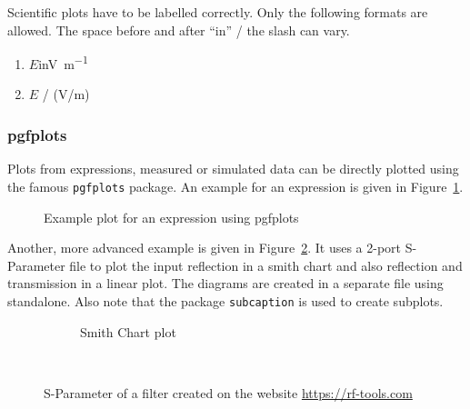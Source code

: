 		Scientific plots have to be labelled correctly. Only the following formats are allowed. The space before and after \enquote{in} / the slash can vary.
		
		\begin{enumerate}
			\item $E${\qquad}in{\qquad}\si{\volt\per\meter}
			\item $E$ / (\si{\volt}/\si{\meter})
		\end{enumerate}
	
		\subsubsection{pgfplots}
		
		Plots from expressions, measured or simulated data can be directly plotted using the famous \texttt{pgfplots} package. An example for an expression is given in Figure~\ref{fig:parabelpgf}.
		
		\begin{figure}[h]
			\centering
			\caption{Example plot for an expression using pgfplots}
			\label{fig:parabelpgf}
		\end{figure}
	
		Another, more advanced example is given in Figure~\ref{fig:sparameterpgf}. It uses a 2-port S-Parameter file to plot the input reflection in a smith chart and also reflection and transmission in a linear plot. The diagrams are created in a separate file using standalone. Also note that the package \texttt{subcaption} is used to create subplots.
	
		\begin{figure}[h]
			\centering
			\begin{subfigure}{0.75\textwidth}
				\centering
				
				\caption{Smith Chart plot}
			\end{subfigure}
			\\
			\begin{subfigure}{0.75\textwidth}
				\centering
				
				\caption{}
			\end{subfigure}
			\caption{S-Parameter of a filter created on the website \url{https://rf-tools.com}}
			\label{fig:sparameterpgf}
		\end{figure}
		
